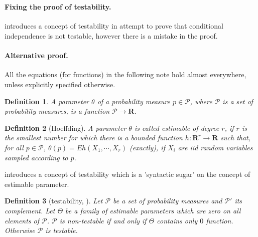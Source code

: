 \documentclass{article}
\title{}
\author{KC}
\date{}
\newtheorem{definition}{Definition}
\begin{document}
\maketitle

\section{}


\paragraph{Fixing the proof of testability.}
\cite{bergsma2004testing} introduces a concept of testability in attempt to prove that conditional independence is not testable, however there is a mistake in the proof.



\paragraph{Alternative proof.}
All the equations (for functions) in the following note  hold almost everywhere, unless explicitly specified otherwise.
\begin{definition}
 A parameter  $\theta$ of a probability measure $p \in \mathcal P$, where $\mathcal P$ is a set of probability measures, is a function $\mathcal P  \to  \mathbf R$.   
\end{definition}


\begin{definition}[Hoeffding]
A parameter  $\theta$ is called estimable of degree $r$, if $r$ is the smallest number for which there is a bounded function $h : \mathbf R^{r} \to \mathbf R$ such that, for all $p \in \mathcal P$, $ \theta(p) = Eh(X_1, \cdots , X_r)$ (exactly),  if $X_i$ are iid random variables sampled according to $p$.
\end{definition}

\cite{bergsma2004testing} introduces a concept of testability which is a 'syntactic sugar' on the concept of estimable parameter.

\begin{definition}[testability, \cite{bergsma2004testing}]
 Let $\mathcal{P}$ be a set of probability measures and $\mathcal{P}'$ its complement. Let $\Theta$ be a family of  estimable parameters which are zero on all elements of $\mathcal{P}$.  $\mathcal{P}$ is non-testable if and only if $\Theta$ contains only $0$ function. Otherwise $\mathcal{P}$ is testable. 
\end{definition}
\end{document}
